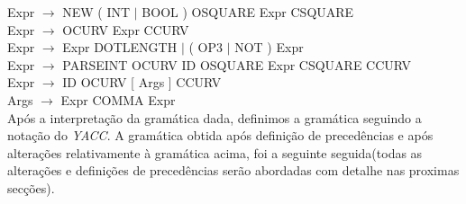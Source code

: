 \documentclass[11pt,a4paper]{article}
\begin{document}
\vspace{.5cm}Expr $\rightarrow$ NEW ( INT $\mid$ BOOL ) OSQUARE Expr CSQUARE\\
\vspace{.5cm}Expr $\rightarrow$ OCURV Expr CCURV\\
\vspace{.5cm}Expr $\rightarrow$ Expr DOTLENGTH $\mid$ ( OP3 $\mid$ NOT ) Expr\\
\vspace{.5cm}Expr $\rightarrow$ PARSEINT OCURV ID OSQUARE Expr CSQUARE CCURV\\
\vspace{.5cm}Expr $\rightarrow$ ID OCURV [ Args ] CCURV\\
\vspace{.5cm}Args $\rightarrow$ Expr { COMMA Expr }\\


Após a interpretação da gramática dada, definimos a gramática seguindo a notação do \emph{YACC}. A gramática obtida após definição de precedências e após alterações relativamente à gramática acima, foi a seguinte seguida(todas as alterações e definições de precedências serão abordadas com detalhe nas proximas secções).

\vspace{0.7cm}
\end{document}
